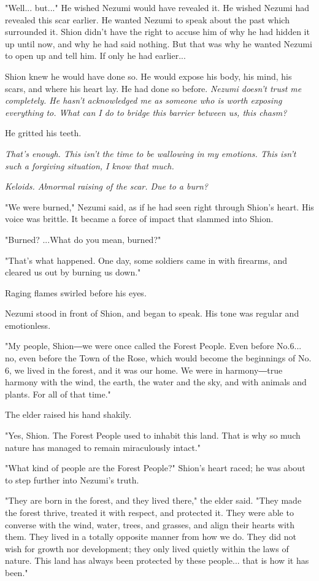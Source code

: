 "Well... but..." He wished Nezumi would have revealed it. He wished
Nezumi had revealed this scar earlier. He wanted Nezumi to speak about
the past which surrounded it. Shion didn't have the right to accuse him
of why he had hidden it up until now, and why he had said nothing. But
that was why he wanted Nezumi to open up and tell him. If only he had
earlier...

Shion knew he would have done so. He would expose his body, his mind,
his scars, and where his heart lay. He had done so before. \emph{Nezumi
doesn't trust me completely. He hasn't acknowledged me as someone who is
worth exposing everything to. What can I do to bridge this barrier
between us, this chasm?}

He gritted his teeth.

\emph{That's enough. This isn't the time to be wallowing in my emotions. This
isn't such a forgiving situation, I know that much.}

\emph{Keloids. Abnormal raising of the scar. Due to a burn?}

"We were burned," Nezumi said, as if he had seen right through Shion's
heart. His voice was brittle. It became a force of impact that slammed
into Shion.

"Burned? ...What do you mean, burned?"

"That's what happened. One day, some soldiers came in with firearms, and
cleared us out by burning us down."

Raging flames swirled before his eyes.


Nezumi stood in front of Shion, and began to speak. His tone was regular
and emotionless.

"My people, Shion―we were once called the Forest People. Even before
No.6... no, even before the Town of the Rose, which would become the
beginnings of No. 6, we lived in the forest, and it was our home. We
were in harmony―true harmony with the wind, the earth, the water and the
sky, and with animals and plants. For all of that time."

The elder raised his hand shakily.

"Yes, Shion. The Forest People used to inhabit this land. That is why so
much nature has managed to remain miraculously intact."

"What kind of people are the Forest People?" Shion's heart raced; he was
about to step further into Nezumi's truth.

"They are born in the forest, and they lived there," the elder said.
"They made the forest thrive, treated it with respect, and protected it.
They were able to converse with the wind, water, trees, and grasses, and
align their hearts with them. They lived in a totally opposite manner
from how we do. They did not wish for growth nor development; they only
lived quietly within the laws of nature. This land has always been
protected by these people... that is how it has been."

